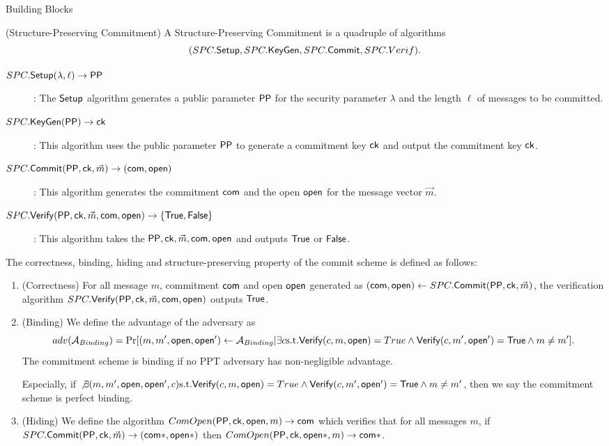 \begin{subsection}{Building Blocks}
  \begin{myDef}{(Structure-Preserving Commitment)}
    A Structure-Preserving Commitment is a quadruple of algorithms
    $$(SPC.{\mathsf{Setup}}, SPC.{\mathsf{KeyGen}}, SPC.{\mathsf{Commit}}, SPC.Verif).$$
    \begin{description}
    \item[$\boldmath{SPC.{\mathsf{Setup}}(\lambda, \ell) \to \mathsf{PP}}$]: The ${\mathsf{Setup}}$ algorithm generates a public parameter $\mathsf{PP}$ for the security parameter $\lambda$ and the length $\ell$ of messages to be committed.
    \item[$\boldmath{SPC.{\mathsf{KeyGen}}(\mathsf{PP}) \to \mathsf{ck}}$]: This algorithm uses the public parameter $\mathsf{PP}$ to generate a commitment key $\mathsf{ck}$ and output the commitment key $\mathsf{ck}$.
    \item[$\boldmath{SPC.{\mathsf{Commit}}(\mathsf{PP}, \mathsf{ck}, \vec{m}) \to (\mathsf{com}, \mathsf{open})}$]: This algorithm generates the commitment $\mathsf{com}$ and the open $\mathsf{open}$ for the message vector $\vec{m}$.
    \item[$\boldmath{SPC.{\mathsf{Verify}}(\mathsf{PP},\mathsf{ck}, \vec{m}, \mathsf{com}, \mathsf{open}) \to \{\mathsf{True}, \mathsf{False}\}}$]:  This algorithm takes the $\mathsf{PP}, \mathsf{ck}, \vec{m}, \mathsf{com}, \mathsf{open}$ and outputs $\mathsf{True}$ or $\mathsf{False}$.
    \end{description}

    The correctness, binding, hiding and structure-preserving property of the commit scheme is defined as follows:
    \begin{enumerate}
    \item (Correctness) For all message $m$, commitment $\mathsf{com}$ and open $\mathsf{open}$ generated as $(\mathsf{com}, \mathsf{open}) \gets SPC.{\mathsf{Commit}}(\mathsf{PP}, \mathsf{ck}, \vec{m})$, the verification algorithm $SPC.{\mathsf{Verify}}(\mathsf{PP},\mathsf{ck}, \vec{m}, \mathsf{com}, \mathsf{open})$ outputs $\mathsf{True}$.

    \item(Binding) We define the advantage of the adversary as
      $$adv(\mathcal{A}_{Binding}) = \operatorname{Pr}[(m, m', \mathsf{open}, \mathsf{open}') \gets \mathcal{A}_{Binding}| \exists c \textrm{s.t.} {\mathsf{Verify}}(c,m, \mathsf{open}) = True \wedge {\mathsf{Verify}}(c, m', \mathsf{open}') = \mathsf{True} \wedge m \neq m'].$$
      The commitment scheme is binding if no PPT adversary has non-negligible advantage.

      Especially, if $\not \exists (m, m', \mathsf{open}, \mathsf{open}', c) \textrm{s.t.} {\mathsf{Verify}}(c,m, \mathsf{open}) = True \wedge {\mathsf{Verify}}(c, m', \mathsf{open}') = \mathsf{True} \wedge m \neq m'$, then we say the commitment scheme is perfect binding.

    \item(Hiding) We define the algorithm $ComOpen(\mathsf{PP}, \mathsf{ck}, \mathsf{open}, m) \to \mathsf{com}$ which verifies that for all messages $m$, if $SPC.{\mathsf{Commit}}(\mathsf{PP}, \mathsf{ck}, \vec{m}) \to (\mathsf{com}*, \mathsf{open}*)$ then $ComOpen(\mathsf{PP}, \mathsf{ck}, \mathsf{open}*, m) \to \mathsf{com}*$.


\end{enumerate}
\end{myDef}
\end{subsection}
